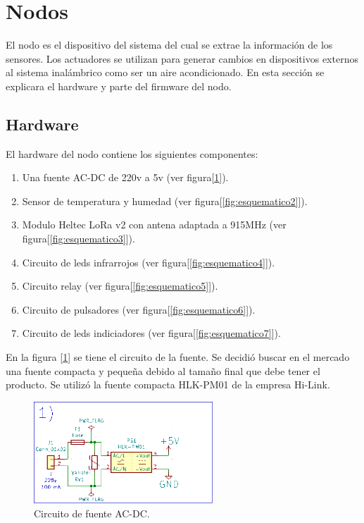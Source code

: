 \section{Nodos}
\label{sec:nodos}

El nodo es el dispositivo del sistema del cual se extrae la información de los sensores. Los actuadores se utilizan para generar cambios en dispositivos externos al sistema inalámbrico como ser un aire acondicionado. En esta sección se explicara el hardware y parte del firmware del nodo.

\subsection{Hardware}

El hardware del nodo contiene los siguientes componentes:

\begin{enumerate}
\item Una fuente AC-DC de 220v a 5v (ver figura[\ref{fig:esquematico1}]).
\item Sensor de temperatura y humedad (ver figura[\ref{fig:esquematico2}]).
\item Modulo Heltec LoRa v2 con antena adaptada a 915MHz (ver figura[\ref{fig:esquematico3}]).
\item Circuito de leds infrarrojos (ver figura[\ref{fig:esquematico4}]).
\item Circuito relay (ver figura[\ref{fig:esquematico5}]).
\item Circuito de pulsadores (ver figura[\ref{fig:esquematico6}]).
\item Circuito de leds indiciadores (ver figura[\ref{fig:esquematico7}]).
\end{enumerate}

En la figura [\ref{fig:esquematico1}] se tiene el circuito de la fuente. Se decidió buscar en el mercado una fuente compacta y pequeña debido al tamaño final que debe tener el producto. Se utilizó la fuente compacta HLK-PM01 de la empresa Hi-Link.

\begin{figure}[h!]
	\centering
	\includegraphics[width=0.6\textwidth]{./Figures/esquematico1.png}
	\caption{Circuito de fuente AC-DC.}
	\label{fig:esquematico1}
\end{figure}

